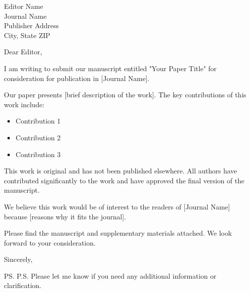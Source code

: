 \documentclass{letter}
\date{\today}
\begin{document}
\begin{letter}{
    Editor Name \\
    Journal Name \\
    Publisher Address \\
    City, State ZIP
}

\opening{Dear Editor,}

I am writing to submit our manuscript entitled "Your Paper Title" for consideration for publication in [Journal Name].

Our paper presents [brief description of the work]. The key contributions of this work include:

\begin{itemize}
    \item Contribution 1
    \item Contribution 2
    \item Contribution 3
\end{itemize}

This work is original and has not been published elsewhere. All authors have contributed significantly to the work and have approved the final version of the manuscript.

We believe this work would be of interest to the readers of [Journal Name] because [reasons why it fits the journal].

Please find the manuscript and supplementary materials attached. We look forward to your consideration.

\closing{Sincerely,}

\ps
P.S. Please let me know if you need any additional information or clarification.

\end{letter}
\end{document}

